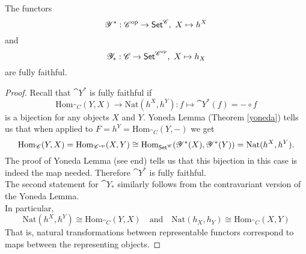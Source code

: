\begin{corollary}\label{yonemb}
The functors
\[\mathscr{Y}^*:\mathscr{C}^{\text{op}} \to \mathsf{Set}^{\mathscr{C}},\ X \mapsto h^X\]
and
\[\mathscr{Y}_*:\mathscr{C} \to \mathsf{Set}^{\mathscr{C}^{\text{op}}},\ X \mapsto h_X\]
are fully faithful.
\end{corollary}
\begin{proof}
Recall that $\cat{Y}^*$ is fully faithful if
\[\mathrm{Hom}_{\cat{C}}(Y,X) \to \mathrm{Nat}(h^X,h^Y): f \mapsto \cat{Y}^*(f) = -\circ f\]
is a bijection for any objects $X$ and $Y$. Yoneda Lemma (Theorem \ref{yoneda}) tells us that when applied to $F = h^Y = \mathrm{Hom}_{\cat{C}}(Y,-)$ we get
\[\mathrm{Hom}_{\mathscr{C}}(Y,X) = \mathrm{Hom}_{\mathscr{C}^{\text{op}}}(X,Y) \cong \mathrm{Hom}_{\mathsf{Set}^{\mathscr{C}}}(\mathscr{Y}^*(X),\mathscr{Y}^*(Y)) = \mathrm{Nat}(h^X,h^Y).\]
The proof of Yoneda Lemma (see end) tells us that this bijection in this case is indeed the map needed. Therefore $\cat{Y}^*$ is fully faithful.\\[1em]
The second statement for $\cat{Y}_*$ similarly follows from the contravariant version of the Yoneda Lemma.\\[1em]
In particular, 
\[\mathrm{Nat}(h^X,h^Y) \cong \mathrm{Hom}_{\cat{C}}(Y,X)\quad \text{and} \quad \mathrm{Nat}(h_X,h_Y)\cong \mathrm{Hom}_{\cat{C}}(X,Y)\]
That is, natural transformations between representable functors correspond to maps between the representing objects.
\end{proof}
%
%

\vspace*{0.1in}

